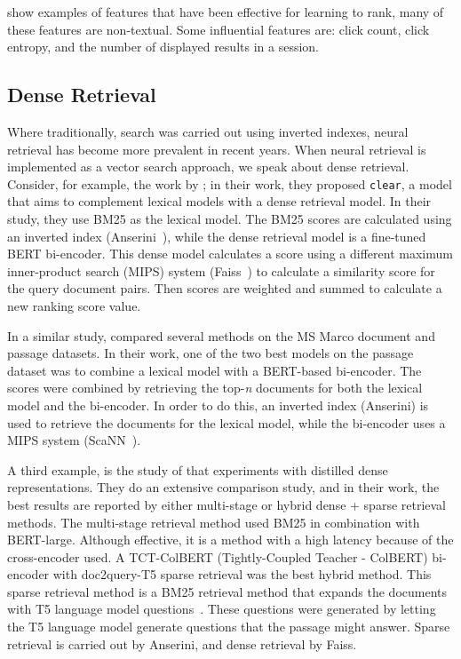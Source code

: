  show examples of features that have been effective for learning to rank, many of these features are non-textual. Some influential features are: click count, click entropy, and the number of displayed results in a session. 

\subsection{Dense Retrieval}
Where traditionally, search was carried out using inverted indexes, neural retrieval has become more prevalent in recent years. When neural retrieval \citep{neural-ir} is implemented as a vector search approach, we speak about dense retrieval.
Consider, for example, the work by \citet{dense-retrieval-1}; in their work, they proposed \texttt{clear}, a model that aims to complement lexical models with a dense retrieval model. In their study, they use BM25 as the lexical model. The BM25 scores are calculated using an inverted index (Anserini~\citep{anserini}), while the dense retrieval model is a fine-tuned BERT bi-encoder. This dense model calculates a score using a different maximum inner-product search (MIPS) system (Faiss~\citep{faiss}) to calculate a similarity score for the query document pairs. Then scores are weighted and summed to calculate a new ranking score value. 

In a similar study, \citet{dense-retrieval-2} compared several methods on the MS Marco document and passage datasets. In their work, one of the two best models on the passage dataset was to combine a lexical model with a BERT-based bi-encoder. The scores were combined by retrieving the top-\textit{n} documents for both the lexical model and the bi-encoder. In order to do this, an inverted index (Anserini) is used to retrieve the documents for the lexical model, while the bi-encoder uses a MIPS system (ScaNN~\citep{scann}).

A third example, is the study of  \citet{dense-retrieval-3} that experiments with distilled dense representations. They do an extensive comparison study, and in their work, the best results are reported by either multi-stage or hybrid dense + sparse retrieval methods. The multi-stage retrieval method used BM25 in combination with BERT-large. Although effective, it is a method with a high latency because of the cross-encoder used. A TCT-ColBERT (Tightly-Coupled Teacher - ColBERT) bi-encoder with doc2query-T5 sparse retrieval was the best hybrid method. This sparse retrieval method is a BM25 retrieval method that expands the documents with T5 language model questions~\citep{2020t5}. These questions were generated by letting the T5 language model generate questions that the passage might answer. Sparse retrieval is carried out by Anserini, and dense retrieval by Faiss. 

